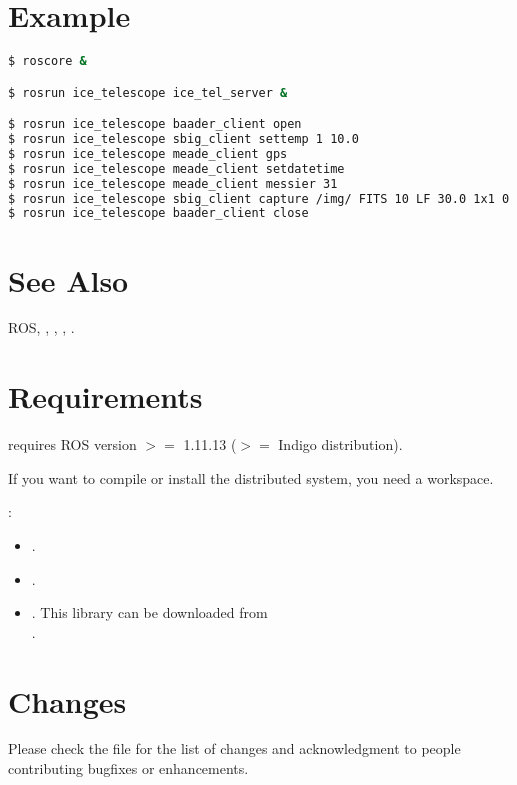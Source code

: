 \documentclass[a4paper,english]{article}
\begin{document}
\section{Example}

\begin{lstlisting}[language=bash, frame=single, breaklines=true]
$ roscore &

$ rosrun ice_telescope ice_tel_server &

$ rosrun ice_telescope baader_client open
$ rosrun ice_telescope sbig_client settemp 1 10.0
$ rosrun ice_telescope meade_client gps
$ rosrun ice_telescope meade_client setdatetime
$ rosrun ice_telescope meade_client messier 31
$ rosrun ice_telescope sbig_client capture /img/ FITS 10 LF 30.0 1x1 0 0 0 0 1 1
$ rosrun ice_telescope baader_client close
\end{lstlisting}


\section{See Also}

ROS, , , , .


\section{Requirements}

\begin{description}\setlength{\itemsep}{0cm}
\item[ROS Environment]  requires ROS version $>=$ 1.11.13 ($>=$ Indigo distribution).
\item[ROS Workspace] If you want to compile or install the distributed system, you need a  workspace.
\item[Libraries]: 
	\begin{itemize}
		\item {}.
		\item {}.
		\item {}. This library can be downloaded from \\ .
	\end{itemize}
\end{description}

\section{Changes}
Please check the file  for the list of changes and
acknowledgment to people contributing bugfixes or enhancements.
\end{document}

